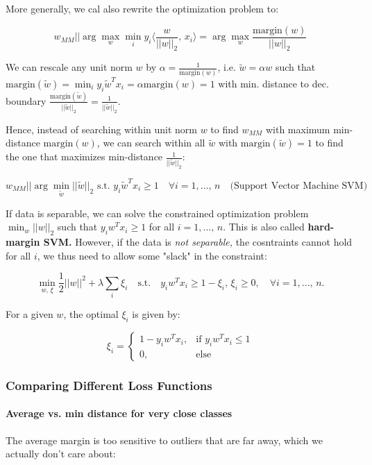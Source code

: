 \documentclass[a4paper]{extarticle}
\begin{document}
More generally, we cal also rewrite the optimization problem to:

\[
    w_{MM} || \arg \max_w \min_i y_i \langle \frac{w}{||w||_2}, \, x_i \rangle = \arg \max_w \frac{\text{margin}(w)}{||w||_2}
\]

We can rescale any unit norm \(w\) by \(\alpha = \frac{1}{\text{margin}(w)}\), i.e. \(\tilde{w} = \alpha w\) such that \(\text{margin}(\tilde{w}) = \min_i y_i \tilde{w}^Tx_i = \alpha \text{margin}(w) = 1\) with min. distance to dec. boundary \(\frac{\text{margin}(\tilde{w})}{||\tilde{w}||_2} = \frac{1}{||\tilde{w}||_2}\).

Hence, instead of searching within unit norm \(w\) to find \(w_{MM}\) with maximum min-distance \(\text{margin}(w)\), we can search within all \(\tilde{w}\) with \(\text{margin}(\tilde{w}) = 1\) to find the one that maximizes min-distance \(\frac{1}{||\tilde{w}||_2}\):

\[
    w_{MM} || \arg \min_{\tilde{w}} ||\tilde{w}||_2 \text{ s.t. } y_i\tilde{w}^Tx_i \geq 1 \quad \forall i = 1,..., \, n \quad \text{(Support Vector Machine SVM)}
\]

If data is separable, we can solve the constrained optimization problem \(\min_w ||w||_2\) such that \(y_iw^Tx_i \geq 1\) for all \(i = 1,..., \, n\). This is also called \textbf{hard-margin SVM.} However, if the data is \textit{not separable,} the cosntraints cannot hold for all \(i\), we thus need to allow some "slack" in the constraint:

\[
    \min_{w, \, \xi} \frac{1}{2} ||w||^2 + \lambda \sum_i\xi_i \quad \text{s.t.} \quad y_iw^Tx_i \geq 1 - \xi_i, \, \xi_i \geq 0, \quad \forall i = 1,..., \, n.
\]

For a given \(w\), the optimal \(\xi_i\) is given by:

\[
    \xi_i = \begin{cases}
        1 - y_iw^Tx_i, &\text{if } y_iw^Tx_i \leq 1 \\
        0, &\text{else}
    \end{cases}
\]

\subsubsection{Comparing Different Loss Functions}

\paragraph{Average vs. min distance for very close classes} The average margin is too sensitive to outliers that are far away, which we actually don't care about:
\end{document}
